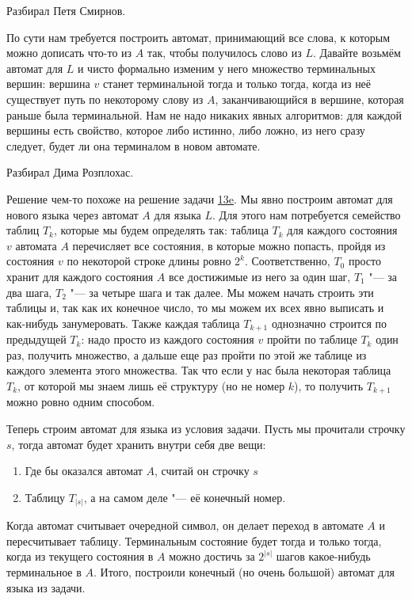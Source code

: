 	Разбирал Петя Смирнов.

	По сути нам требуется построить автомат, принимающий все слова, к которым можно дописать что-то из $A$ так, чтобы
	получилось слово из $L$.
	Давайте возьмём автомат для $L$ и чисто формально изменим у него множество терминальных вершин:
	вершина $v$ станет терминальной тогда и только тогда, когда из неё существует путь по некоторому слову из $A$,
	заканчивающийся в вершине, которая раньше была терминальной.
	Нам не надо никаких явных алгоритмов: для каждой вершины есть свойство, которое либо истинно, либо ложно, из него сразу
	следует, будет ли она терминалом в новом автомате.

	Разбирал Дима Розплохас.

	Решение чем-то похоже на решение задачи \hyperref[prob13e]{13e}.
	Мы явно построим автомат для нового языка через автомат $A$ для языка $L$.
	Для этого нам потребуется семейство таблиц $T_k$, которые мы будем определять так:
	таблица $T_k$ для каждого состояния $v$ автомата $A$ перечисляет все состояния,
	в которые можно попасть, пройдя из состояния $v$ по некоторой строке длины ровно $2^k$.
	Соответственно, $T_0$ просто хранит для каждого состояния $A$ все достижимые из него за один шаг,
	$T_1$ "--- за два шага, $T_2$ "--- за четыре шага и так далее.
	Мы можем начать строить эти таблицы и, так как их конечное число, то мы можем их всех явно выписать и как-нибудь
	занумеровать.
	Также каждая таблица $T_{k+1}$ однозначно строится по предыдущей $T_k$: надо просто из каждого состояния
	$v$ пройти по таблице $T_k$ один раз, получить множество, а дальше еще раз пройти по этой же таблице из каждого элемента этого множества.
	Так что если у нас была некоторая таблица $T_k$, от которой мы знаем лишь её структуру (но не номер $k$), то получить $T_{k+1}$ можно ровно одним способом.

	Теперь строим автомат для языка из условия задачи.
	Пусть мы прочитали строчку $s$, тогда автомат будет хранить внутри себя две вещи:
	\begin{enumerate}
		\item Где бы оказался автомат $A$, считай он строчку $s$
		\item Таблицу $T_{|s|}$, а на самом деле "--- её конечный номер.
	\end{enumerate}
	Когда автомат считывает очередной символ, он делает переход в автомате $A$ и пересчитывает таблицу.
	Терминальным состояние будет тогда и только тогда, когда из текущего состояния в $A$ можно достичь за $2^{|s|}$ шагов
	какое-нибудь терминальное в $A$.
	Итого, построили конечный (но очень большой) автомат для языка из задачи.
